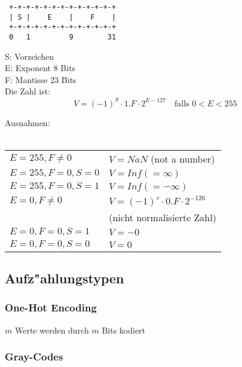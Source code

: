 \documentclass[german, 10pt, a4paper, twocolumn]{scrartcl}
\theoremstyle{definition}
\begin{document}
\small
\begin{verbatim}
 +-+-+-+-+-+-+-+-+-+-+-+-+
 | S |    E    |    F    |
 +-+-+-+-+-+-+-+-+-+-+-+-+
 0   1         9        31
\end{verbatim}
\normalsize
                                                                                                   
S: Vorzeichen\\
E: Exponent 8 Bits\\
F: Mantisse 23 Bits\\
                                                                                                   
Die Zahl ist:
\begin{displaymath}
        V = (-1)^S \cdotp 1.F \cdotp 2^{E-127} \quad \mbox{falls } 0 < E < 255
\end{displaymath}
                                                                                                   
Ausnahmen:\\\\
\begin{tabular}{l l}
        $E=255, F\neq 0$ &              $V=NaN$ (not a number)\\
        $E=255, F=0, S=0$ &             $V=Inf (=\infty)$\\
        $E=255, F=0, S=1$ &             $V=Inf (=-\infty)$\\
        $E=0, F\neq 0$ &                $V=(-1)^{s}\cdotp 0.F\cdotp 2^{-126}$\\
        &                               (nicht normalisierte Zahl)\\
        $E=0, F=0, S=1$ &               $V=-0$\\
        $E=0, F=0, S=0$ &               $V=0$
\end{tabular}

\subsection{Aufz"ahlungstypen}

\subsubsection{One-Hot Encoding}

$m$ Werte werden durch $m$ Bits kodiert

\subsubsection{Gray-Codes}
\end{document}
